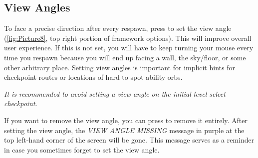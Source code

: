 \documentclass[12pt,a4paper]{article}
\begin{document}
    \subsection{View Angles}
    
        To face a precise direction after every respawn, press  
        to set the view angle (\cref{fig:Picture8}, top right portion of framework options). This will improve overall user experience.
        If this is not set, you will have to keep turning your mouse every
        time you respawn because you will end up facing a wall, the sky/floor, or some other arbitrary place. 
        Setting view angles is important for implicit hints for checkpoint routes or locations of hard to spot ability orbs.
        
        \emph{It is recommended to avoid setting a view angle on the initial level select checkpoint.}
        
        If you want to remove the view angle, you can press  to remove it entirely. 
        After setting the view angle, the \emph{VIEW ANGLE MISSING} message in purple at the top left-hand corner of the screen will be gone. 
        This message serves as a reminder in case you sometimes forget to set the view angle. 

        
\end{document}
